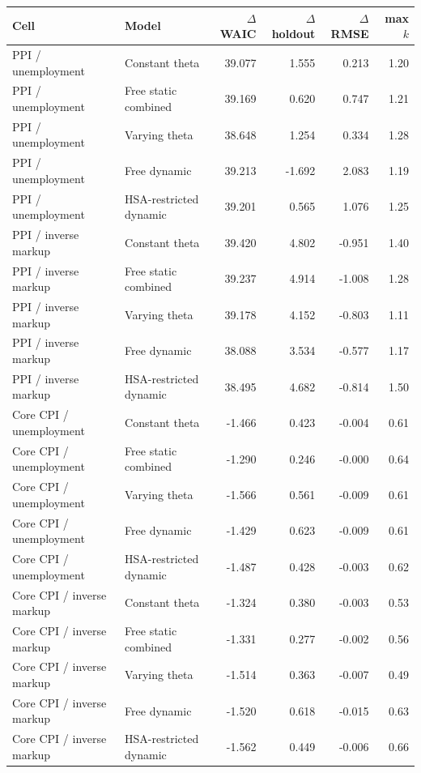 \begin{tabular}{@{}llrrrr@{}}
\toprule
Cell & Model & $\Delta$WAIC & $\Delta$holdout & $\Delta$RMSE & max $k$ \\
\midrule
PPI / unemployment & Constant theta & 39.077 & 1.555 & 0.213 & 1.20 \\
PPI / unemployment & Free static combined & 39.169 & 0.620 & 0.747 & 1.21 \\
PPI / unemployment & Varying theta & 38.648 & 1.254 & 0.334 & 1.28 \\
PPI / unemployment & Free dynamic & 39.213 & -1.692 & 2.083 & 1.19 \\
PPI / unemployment & HSA-restricted dynamic & 39.201 & 0.565 & 1.076 & 1.25 \\
PPI / inverse markup & Constant theta & 39.420 & 4.802 & -0.951 & 1.40 \\
PPI / inverse markup & Free static combined & 39.237 & 4.914 & -1.008 & 1.28 \\
PPI / inverse markup & Varying theta & 39.178 & 4.152 & -0.803 & 1.11 \\
PPI / inverse markup & Free dynamic & 38.088 & 3.534 & -0.577 & 1.17 \\
PPI / inverse markup & HSA-restricted dynamic & 38.495 & 4.682 & -0.814 & 1.50 \\
Core CPI / unemployment & Constant theta & -1.466 & 0.423 & -0.004 & 0.61 \\
Core CPI / unemployment & Free static combined & -1.290 & 0.246 & -0.000 & 0.64 \\
Core CPI / unemployment & Varying theta & -1.566 & 0.561 & -0.009 & 0.61 \\
Core CPI / unemployment & Free dynamic & -1.429 & 0.623 & -0.009 & 0.61 \\
Core CPI / unemployment & HSA-restricted dynamic & -1.487 & 0.428 & -0.003 & 0.62 \\
Core CPI / inverse markup & Constant theta & -1.324 & 0.380 & -0.003 & 0.53 \\
Core CPI / inverse markup & Free static combined & -1.331 & 0.277 & -0.002 & 0.56 \\
Core CPI / inverse markup & Varying theta & -1.514 & 0.363 & -0.007 & 0.49 \\
Core CPI / inverse markup & Free dynamic & -1.520 & 0.618 & -0.015 & 0.63 \\
Core CPI / inverse markup & HSA-restricted dynamic & -1.562 & 0.449 & -0.006 & 0.66 \\
\bottomrule
\end{tabular}
